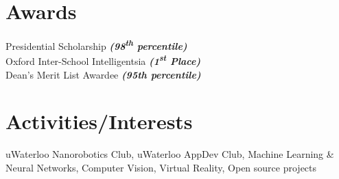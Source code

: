 \begin{minipage}[t]{0.33\textwidth}
        \section{Awards} 
        Presidential Scholarship {\footnotesize \textit{\textbf{(98\textsuperscript{th} percentile)}}}\\
        Oxford Inter-School Intelligentsia 
        {\footnotesize \textit{\textbf{(1\textsuperscript{st} Place)}}}\\
        Dean's Merit List Awardee 
        {\footnotesize \textit{\textbf{(95th percentile)}}}\\

        \section{Activities/Interests} 
        uWaterloo Nanorobotics Club, uWaterloo AppDev Club, Machine Learning \& Neural Networks, Computer Vision, Virtual Reality, Open source projects


\end{minipage} %
\hfill
%
%
